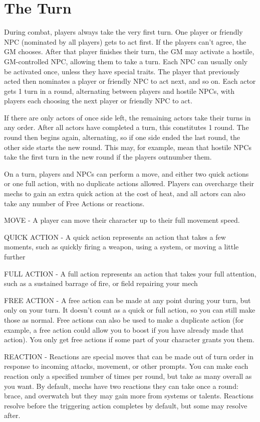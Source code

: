 \section{The Turn}
During combat, players always take the very first turn. One player or friendly NPC (nominated
by all players) gets to act first. If the players can’t agree, the GM chooses. After that player
finishes their turn, the GM may activate a hostile, GM-controlled NPC, allowing them to take a
turn. Each NPC can usually only be activated once, unless they have special traits. The player
that previously acted then nominates a player or friendly NPC to act next, and so on. Each
actor gets 1 turn in a round, alternating between players and hostile NPCs, with players each
choosing the next player or friendly NPC to act.


If there are only actors of once side left, the remaining actors take their turns in any order. After
all actors have completed a turn, this constitutes 1 round. The round then begins again,
alternating, so if one side ended the last round, the other side starts the new round. This may, for
example, mean that hostile NPCs take the first turn in the new round if the players outnumber
them.

On a turn, players and NPCs can perform a move, and either two quick actions or one full
action, with no duplicate actions allowed. Players can overcharge their mechs to gain an extra
quick action at the cost of heat, and all actors can also take any number of Free Actions or
reactions.


MOVE - A player can move their character up to their full movement speed.

QUICK ACTION - A quick action represents an action that takes a few moments, such as
quickly firing a weapon, using a system, or moving a little further

FULL ACTION - A full action represents an action that takes your full attention, such as a
sustained barrage of fire, or field repairing your mech

FREE ACTION - A free action can be made at any point during your turn, but only on your turn. It
doesn’t count as a quick or full action, so you can still make those as normal. Free actions can
also be used to make a duplicate action (for example, a free action could allow you to boost if
you have already made that action). You only get free actions if some part of your character
grants you them.

REACTION - Reactions are special moves that can be made out of turn order in response to
incoming attacks, movement, or other prompts. You can make each reaction only a specified
number of times per round, but take as many overall as you want. By default, mechs have two
reactions they can take once a round: brace, and overwatch but they may gain more from
systems or talents. Reactions resolve before the triggering action completes by default, but
some may resolve after.


